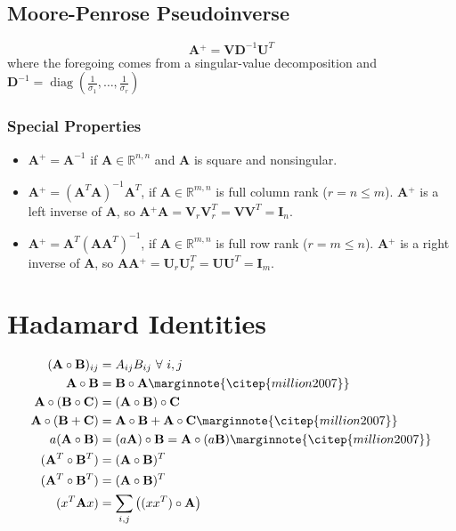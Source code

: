 \documentclass{book}
\newcommand{\mA}{\mathbf{A}}
\newcommand{\mB}{\mathbf{B}}
\newcommand{\mC}{\mathbf{C}}
\newcommand{\mD}{\mathbf{D}}
\newcommand{\mI}{\mathbf{I}}
\newcommand{\mU}{\mathbf{U}}
\newcommand{\mV}{\mathbf{V}}
\DeclareMathOperator{\diag}{diag}
\newcommand{\sRmn}{\mathbb{R}^{m,n}}
\newcommand{\sRnn}{\mathbb{R}^{n,n}}
\newcommand{\pinv}{\!^+}
\newcommand{\eqcite}[1]{\marginnote{\citep{#1}}}
\begin{document}
\section{Moore-Penrose Pseudoinverse}
\begin{equation}
\mA\pinv = \mV \mD^{-1} \mU^T
\end{equation}
where the foregoing comes from a singular-value decomposition and $\mD^{-1}=\diag(\frac{1}{\sigma_1},\ldots,\frac{1}{\sigma_r})$

\subsection*{Special Properties}
\begin{itemize}
\item $\mA\pinv=\mA^{-1}$ if $\mA\in\sRnn$ and $\mA$ is square and nonsingular.
\item $\mA\pinv=(\mA^T\mA)^{-1}\mA^T$, if $\mA\in\sRmn$ is full column rank ($r=n\le m$). $\mA\pinv$ is a left inverse of $\mA$, so $\mA\pinv\mA=\mV_r\mV_r^T=\mV\mV^T=\mI_n$.
\item $\mA\pinv=\mA^T(\mA\mA^T)^{-1}$, if $\mA\in\sRmn$ is full row rank ($r=m\le n$). $\mA\pinv$ is a right inverse of $\mA$, so $\mA\mA\pinv=\mU_r\mU_r^T=\mU\mU^T=\mI_m$.
\end{itemize} %



\chapter{Hadamard Identities}

\begin{align}
(\mA\circ\mB)_{ij}    &= A_{ij}B_{ij}~\forall~i,j                            \\
\mA\circ\mB           &= \mB\circ\mA                    \eqcite{million2007} \\
\mA\circ(\mB\circ\mC) &= (\mA\circ\mB)\circ\mC                               \\
\mA\circ(\mB+\mC)     &= \mA\circ\mB+\mA\circ\mC        \eqcite{million2007} \\
a(\mA\circ\mB)        &= (a\mA)\circ\mB =\mA\circ(a\mB) \eqcite{million2007} \\
(\mA^T\circ\mB^T)     &= (\mA\circ\mB)^T                                     \\
(\mA^T\circ\mB^T)     &= (\mA\circ\mB)^T                                     \\
(x^T \mA x)           &= \sum_{i,j}\big((x x^T)\circ\mA\big)
\end{align}
\end{document}
